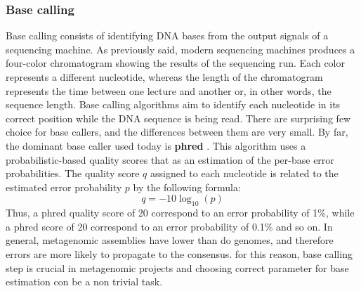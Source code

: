 \subsubsection*{Base calling}
Base calling consists of identifying DNA bases from the output signals of a sequencing machine. As previously said, modern sequencing machines produces a four-color chromatogram showing the results of the sequencing run. Each color represents a different nucleotide, whereas the length of the chromatogram represents the time between one lecture and another or, in other words, the sequence length. Base calling algorithms aim to identify each nucleotide in its correct position while the DNA sequence is being read. There are surprising few choice for base callers, and the differences between them are very small. By far, the dominant base caller used today is \textbf{phred} \cite{ewing1998base}. This algorithm uses a probabilistic-based quality scores that as an estimation of the per-base error probabilities. The quality score $q$ assigned to each nucleotide is related to the estimated error probability $p$ by the following formula:\\
\begin{equation*}
q = -10 \log_{10}(p)
\end{equation*}
Thus, a phred quality score of 20 correspond to an error probability of 1\%, while a phred score of 20 correspond to an error probability of 0.1\% and so on. In general, metagenomic assemblies have lower than do genomes, and therefore errors are more likely to propagate to the consensus. for this reason, base calling step is crucial in metagenomic projects and choosing correct parameter for base estimation con be a non trivial task.\\

